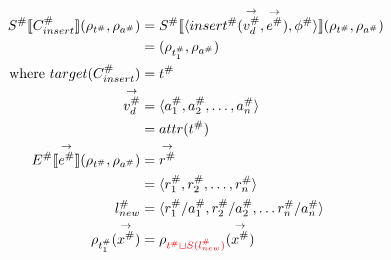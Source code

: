 \begin{align*}
    S^\# \llbracket C_{insert}^\# \rrbracket (\rho_{t^\#}, \rho_{a^\#})
                                               & = S^\# \llbracket \langle insert^\#(\overset{\rightarrow}{v_d^\#}, \overset{\rightarrow}{e^\#}), \phi^\# \rangle \rrbracket (\rho_{t^\#}, \rho_{a^\#}) \\
                                               & = (\rho_{t_1^\#}, \rho_{a^\#})                                                                                                                         \\
    \text{where } target(C_{insert}^\#)        & = t^\#                                                                                                                                                 \\
    \overset{\rightarrow}{v_d^\#}              & = \langle a_1^\#, a_2^\#, \dots, a_n^\# \rangle                                                                                                        \\
                                               & = attr(t^\#)                                                                                                                                           \\
    E^\# \llbracket \overset{\rightarrow}{e^\#} \rrbracket (\rho_{t^\#}, \rho_{a^\#})
                                               & = \overset{\rightarrow}{r^\#}                                                                                                                          \\
                                               & = \langle r_1^\#, r_2^\#, \dots, r_n^\# \rangle                                                                                                        \\
    l_{new}^\#                                 & = \langle r_1^\#/a_1^\#, r_2^\#/a_2^\#, \dots r_n^\#/a_n^\# \rangle                                                                                    \\
    \rho_{t_1^\#}(\overset{\rightarrow}{x^\#}) & = \rho_{\textcolor{red}{t^\# \sqcup S(l_{new}^\#)}}(\overset{\rightarrow}{x^\#})
\end{align*}



